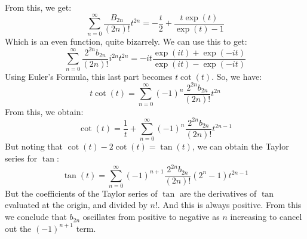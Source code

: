             From this, we get:
            \begin{equation}
                \sum_{n=0}^{\infty}\frac{B_{2n}}{(2n)!}t^{2n}
                =-\frac{t}{2}+\frac{t\exp(t)}{\exp(t)-1}
            \end{equation}
            Which is an even function, quite bizarrely.
            We can use this to get:
            \begin{equation}
                \sum_{n=0}^{\infty}
                \frac{2^{2n}b_{2n}}{(2n)!}i^{2n}t^{2n}
                =-it\frac{\exp(it)+\exp(-it)}{\exp(it)-\exp(-it)}
            \end{equation}
            Using Euler's Formula, this last part becomes
            $t\cot(t)$. So, we have:
            \begin{equation}
                t\cot(t)=\sum_{n=0}^{\infty}
                (-1)^{n}\frac{2^{2n}b_{2n}}{(2n)!}t^{2n}
            \end{equation}
            From this, we obtain:
            \begin{equation}
                \cot(t)=\frac{1}{t}+\sum_{n=0}^{\infty}
                (-1)^{n}\frac{2^{2n}b_{2n}}{(2n)!}t^{2n-1}
            \end{equation}
            But noting that $\cot(t)-2\cot(t)=\tan(t)$, we can
            obtain the Taylor series for $\tan$:
            \begin{equation}
                \tan(t)=\sum_{n=0}^{\infty}
                (-1)^{n+1}\frac{2^{2n}b_{2n}}{(2n)!}(2^{n}-1)t^{2n-1}
            \end{equation}
            But the coefficients of the Taylor series of $\tan$
            are the derivatives of $\tan$ evaluated at the origin,
            and divided by $n!$. And this is always positive. From
            this we conclude that $b_{2n}$ oscillates from positive
            to negative as $n$ increasing to cancel out the
            $(-1)^{n+1}$ term.
